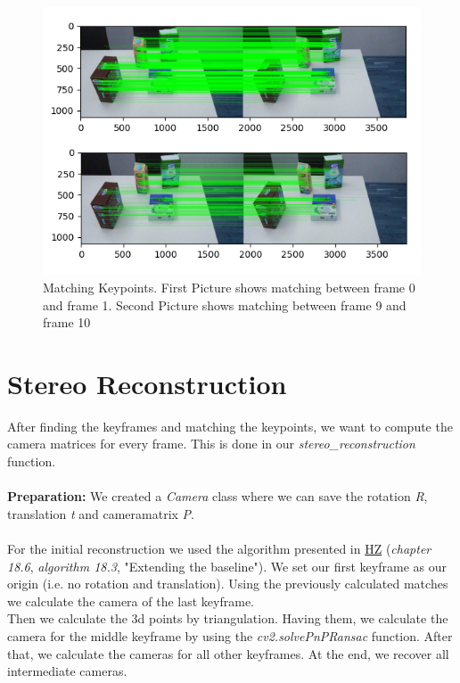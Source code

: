 \documentclass[paper=a4, fontsize=11pt]{scrartcl}
\numberwithin{equation}{section}		%
\numberwithin{figure}{section}			%
\numberwithin{table}{section}				%
\begin{document}
\begin{figure}[h!]
\centering
\includegraphics[width=1\textwidth]{img/matching}
\caption{Matching Keypoints. First Picture shows matching between frame 0 and frame 1. Second Picture shows matching between frame 9 and frame 10}
\end{figure}

\section*{Stereo Reconstruction}
After finding the keyframes and matching the keypoints, we want to compute the camera matrices for every frame. This is done in our \emph{stereo\_reconstruction} function.\\\\\textbf{Preparation:} We created a \emph{Camera} class where we can save the rotation \emph{R}, translation \emph{t} and cameramatrix \emph{P}.\\\\For the initial reconstruction we used the algorithm presented in \href{http://www.robots.ox.ac.uk/~vgg/hzbook/}{HZ} (\emph{chapter 18.6}, \emph{algorithm 18.3}, "Extending the baseline"). We set our first keyframe as our origin (i.e. no rotation and translation). Using the previously calculated matches we calculate the camera of the last keyframe.\\Then we calculate the 3d points by triangulation. Having them, we calculate the camera for the middle keyframe by using the \emph{cv2.solvePnPRansac} function. After that, we calculate the cameras for all other keyframes. At the end, we recover all intermediate cameras.
\end{document}
